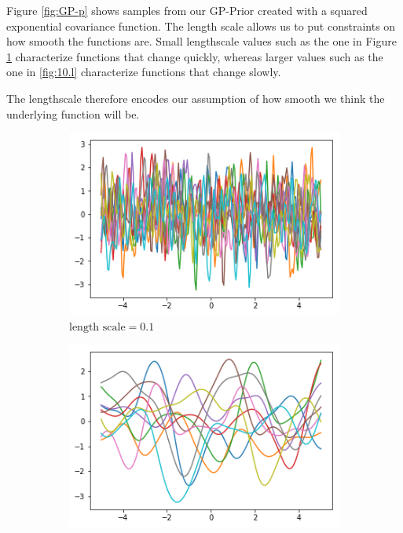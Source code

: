 \documentclass{article}
\begin{document}
Figure \ref{fig:GP-p} shows samples from our GP-Prior created with a squared exponential covariance function. The length scale allows us to put constraints on how smooth the functions are. Small lengthscale values such as the one in Figure \ref{fig:0.1l} characterize functions that change quickly, whereas larger values such as the one in \ref{fig:10.l} characterize functions that change slowly.

The lengthscale therefore encodes our assumption of how smooth we think the underlying function will be.
\begin{figure}[H]
	\centering
	\begin{subfigure}[t]{0.3\linewidth}
		\includegraphics[width=\linewidth]{01}
		\caption{$\text{length scale} = 0.1$}
		\label{fig:0.1l}
	\end{subfigure}
	\begin{subfigure}[t]{0.3\linewidth}
		\includegraphics[width=\linewidth]{1}

\end{subfigure}
\end{figure}
\end{document}
